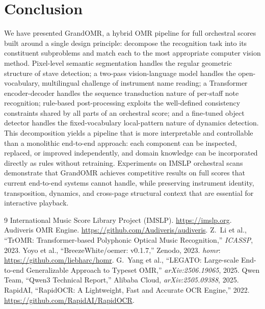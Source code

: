 \documentclass[11pt,a4paper]{article}
\begin{document}
\section{Conclusion}


We have presented GrandOMR, a hybrid OMR pipeline for full orchestral scores built around a single design principle: decompose the recognition task into its constituent subproblems and match each to the most appropriate computer vision method.
Pixel-level semantic segmentation handles the regular geometric structure of stave detection; a two-pass vision-language model handles the open-vocabulary, multilingual challenge of instrument name reading; a Transformer encoder-decoder handles the sequence transduction nature of per-staff note recognition; rule-based post-processing exploits the well-defined consistency constraints shared by all parts of an orchestral score; and a fine-tuned object detector handles the fixed-vocabulary local-pattern nature of dynamics detection.
This decomposition yields a pipeline that is more interpretable and controllable than a monolithic end-to-end approach: each component can be inspected, replaced, or improved independently, and domain knowledge can be incorporated directly as rules without retraining.
Experiments on IMSLP orchestral scans demonstrate that GrandOMR achieves competitive results on full scores that current end-to-end systems cannot handle, while preserving instrument identity, transposition, dynamics, and cross-page structural context that are essential for interactive playback.


\begin{thebibliography}{9}
 International Music Score Library Project (IMSLP). \url{https://imslp.org}.
 Audiveris OMR Engine. \url{https://github.com/Audiveris/audiveris}.
 Z.~Li et al., ``TrOMR: Transformer-based Polyphonic Optical Music Recognition,'' \textit{ICASSP}, 2023.
 Yoyo et al., ``BreezeWhite/oemer: v0.1.7,'' Zenodo, 2023. \textit{homr}: \url{https://github.com/liebharc/homr}.
 G.~Yang et al., ``LEGATO: Large-scale End-to-end Generalizable Approach to Typeset OMR,'' \textit{arXiv:2506.19065}, 2025.
 Qwen Team, ``Qwen3 Technical Report,'' Alibaba Cloud, \textit{arXiv:2505.09388}, 2025.
 RapidAI, ``RapidOCR: A Lightweight, Fast and Accurate OCR Engine,'' 2022. \url{https://github.com/RapidAI/RapidOCR}.
\end{thebibliography}
\end{document}
